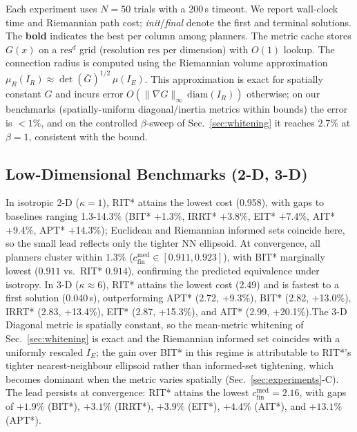 \documentclass[journal]{IEEEtran}
\newcommand{\IR}{I_{\!R}}
\newcommand{\IE}{I_{\!E}}
\begin{document}
Each experiment uses $N=50$ trials with a 200\,s timeout. We report wall-clock time and Riemannian path cost; \emph{init}/\emph{final} denote the first and terminal solutions. The \textbf{bold} indicates the best per column among planners.
The metric cache stores $G(x)$ on a $\mathrm{res}^d$ grid (resolution $\mathrm{res}$ per dimension) with $O(1)$ lookup. The connection radius is computed using the Riemannian volume approximation $\mu_R(\IR)\approx \det(\bar{G})^{1/2}\,\mu(\IE)$. This approximation is exact for spatially constant $G$ and incurs error $O(\|\nabla G\|_\infty\,\mathrm{diam}(\IR))$ otherwise; on our benchmarks (spatially-uniform diagonal/inertia metrics within bounds) the error is $<1\%$, and on the controlled $\beta$-sweep of Sec.~\ref{sec:whitening} it reaches $2.7\%$ at $\beta=1$, consistent with the bound.

\vspace{-4mm}
\subsection{Low-Dimensional Benchmarks (2-D, 3-D)}


In isotropic 2-D ($\kappa=1$), RIT* attains the lowest cost (0.958),
with gaps to baselines ranging 1.3-14.3\% (BIT* +1.3\%, IRRT* +3.8\%,
EIT* +7.4\%, AIT* +9.4\%, APT* +14.3\%); Euclidean and Riemannian
informed sets coincide here, so the small lead reflects only the tighter NN
ellipsoid. At convergence, all planners cluster within $1.3\%$ ($c^{\mathrm{med}}_{\mathrm{fin}}\!\in\![0.911,0.923]$), with BIT* marginally lowest ($0.911$ vs.\ RIT* $0.914$), confirming the predicted equivalence under isotropy.
In 3-D ($\kappa\!\approx\!6$), RIT* attains the lowest cost (2.49)
and is fastest to a first solution (0.040\,s), outperforming APT*
(2.72, +9.3\%), BIT* (2.82, +13.0\%), IRRT* (2.83, +13.4\%), EIT*
(2.87, +15.3\%), and AIT* (2.99, +20.1\%).The 3-D Diagonal metric is spatially constant, so the
mean-metric whitening of Sec.~\ref{sec:whitening} is exact and the
Riemannian informed set coincides with a uniformly rescaled $\IE$;
the gain over BIT* in this regime is attributable to RIT*'s tighter
nearest-neighbour ellipsoid rather than informed-set tightening,
which becomes dominant when the metric varies spatially (Sec.~\ref{sec:experiments}-C). The lead persists at convergence: RIT* attains the lowest $c^{\mathrm{med}}_{\mathrm{fin}}=2.16$, with gaps of $+1.9\%$ (BIT*), $+3.1\%$ (IRRT*), $+3.9\%$ (EIT*), $+4.4\%$ (AIT*), and $+13.1\%$ (APT*).
\end{document}
